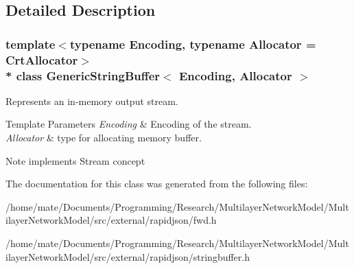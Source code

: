 \subsection{Detailed Description}
\subsubsection*{template$<$typename Encoding, typename Allocator = Crt\+Allocator$>$\\*
class Generic\+String\+Buffer$<$ Encoding, Allocator $>$}

Represents an in-\/memory output stream. 


\begin{DoxyTemplParams}{Template Parameters}
{\em Encoding} & Encoding of the stream. \\
\hline
{\em Allocator} & type for allocating memory buffer. \\
\hline
\end{DoxyTemplParams}
\begin{DoxyNote}{Note}
implements Stream concept 
\end{DoxyNote}


The documentation for this class was generated from the following files\+:\begin{DoxyCompactItemize}
\item 
/home/mate/\+Documents/\+Programming/\+Research/\+Multilayer\+Network\+Model/\+Multilayer\+Network\+Model/src/external/rapidjson/fwd.\+h\item 
/home/mate/\+Documents/\+Programming/\+Research/\+Multilayer\+Network\+Model/\+Multilayer\+Network\+Model/src/external/rapidjson/stringbuffer.\+h\end{DoxyCompactItemize}
